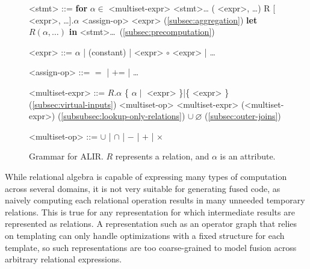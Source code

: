 \documentclass[acmsmall,screen,nonacm]{acmart}\settopmatter{printfolios=true,printccs=false,printacmref=false}
\newcommand*{\plusequals}{\mathrel{\mathord{+}\mathord{=}}}
\begin{document}
\begin{figure}
    \begin{minipage}{0.4\textwidth}
    \begin{grammar}\footnotesize
        <stmt> ::= \textbf{for} $\alpha \in $ <multiset-expr> <stmt>\dots
            \alt ( <expr>, \dots )
            \alt R [ <expr>, \dots ].$\alpha$ <assign-op> <expr> (\ref{subsec:aggregation})
            \alt \textbf{let} $R(\alpha, \dots)$ \textbf{in} <stmt>\dots\ (\ref{subsec:precomputation})
        
        <expr> ::= $\alpha$ | (constant) | <expr> $\circ$ <expr> | \dots

        <assign-op> ::= $=$ | $\plusequals$ | \dots
    \end{grammar}
    \end{minipage}
    \begin{minipage}{0.5\textwidth}
    \begin{grammar}\footnotesize
        <multiset-expr> ::= $R.\alpha$
            \alt \{ $\alpha \mid $ <expr> \}\quad |\quad \{ <expr> \} (\ref{subsec:virtual-inputs})
             <multiset-op> <multiset-expr>
             (<multiset-expr>) (\ref{subsubsec:lookup-only-relations})
             $\cup\ \varnothing$ (\ref{subsec:outer-joins})

        <multiset-op> ::= $\cup$ | $\cap$ | $-$ | $+$ | $\times$
    \end{grammar}
    \end{minipage}
    \vspace{-0.5em}
    \caption{Grammar for ALIR. $R$ represents a relation, and $\alpha$ is an attribute.}
    \label{fig:alir-grammar}
    \vspace{-1em}
\end{figure}

While relational algebra is capable of expressing many types of computation across several domains,
it is not very suitable for generating fused code, as naively computing each relational operation
results in many unneeded temporary relations.
This is true for any representation for which intermediate results are represented as relations.
A representation such as an operator graph that relies on templating can only handle optimizations
with a fixed structure for each template, so such representations are
too coarse-grained to model fusion across arbitrary relational expressions.
\end{document}

